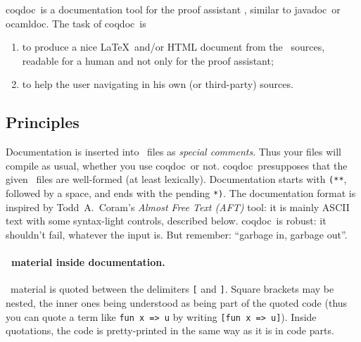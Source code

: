 
\newcommand{\javadoc}{\textsf{javadoc}}
\newcommand{\ocamldoc}{\textsf{ocamldoc}}
\newcommand{\coqdoc}{\textsf{coqdoc}}
\newcommand{\texmacs}{\TeX{}macs}
\newcommand{\monurl}[1]{#1}
\newcommand{\mm}{\symbol{45}\symbol{45}}


\coqdoc\ is a documentation tool for the proof assistant
\Coq, similar to \javadoc\ or \ocamldoc.
The task of \coqdoc\ is
\begin{enumerate}
\item to produce a nice \LaTeX\ and/or HTML document from the \Coq\
  sources, readable for a human and not only for the proof assistant;
\item to help the user navigating in his own (or third-party) sources.
\end{enumerate}



\subsection{Principles}

Documentation is inserted into \Coq\ files as \emph{special comments}.
Thus your files will compile as usual, whether you use \coqdoc\ or not.
\coqdoc\ presupposes that the given \Coq\ files are well-formed (at
least lexically).  Documentation starts with
\texttt{(**}, followed by a space, and ends with the pending \texttt{*)}.
The documentation format is inspired
  by Todd~A.~Coram's \emph{Almost Free Text (AFT)} tool: it is mainly
ASCII text with some syntax-light controls, described below.
\coqdoc\ is robust: it shouldn't fail, whatever the input is. But
remember: ``garbage in, garbage out''.

\paragraph{\Coq\ material inside documentation.}
\Coq\ material is quoted between the
delimiters \texttt{[} and \texttt{]}. Square brackets may be nested,
the inner ones being understood as being part of the quoted code (thus
you can quote a term like \texttt{fun x => u} by writing
\texttt{[fun x => u]}). Inside quotations, the code is pretty-printed in
the same way as it is in code parts.

